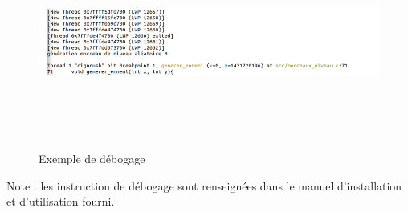 \documentclass[a4paper,12pt]{article}
\begin{document}
\begin{figure}[h]
	\centering
	\includegraphics[height=7cm]{img/debug.png}
	\caption{Exemple de débogage}
	\label{débogage}
\end{figure}
Note : les instruction de débogage sont renseignées dans le manuel d'installation et d'utilisation fourni.

\end{document}
